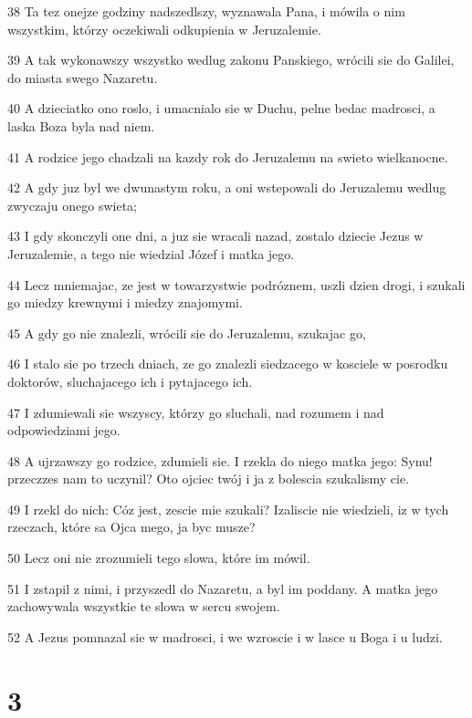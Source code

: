 \par 38 Ta tez onejze godziny nadszedlszy, wyznawala Pana, i mówila o nim wszystkim, którzy oczekiwali odkupienia w Jeruzalemie.
\par 39 A tak wykonawszy wszystko wedlug zakonu Panskiego, wrócili sie do Galilei, do miasta swego Nazaretu.
\par 40 A dzieciatko ono roslo, i umacnialo sie w Duchu, pelne bedac madrosci, a laska Boza byla nad niem.
\par 41 A rodzice jego chadzali na kazdy rok do Jeruzalemu na swieto wielkanocne.
\par 42 A gdy juz byl we dwunastym roku, a oni wstepowali do Jeruzalemu wedlug zwyczaju onego swieta;
\par 43 I gdy skonczyli one dni, a juz sie wracali nazad, zostalo dziecie Jezus w Jeruzalemie, a tego nie wiedzial Józef i matka jego.
\par 44 Lecz mniemajac, ze jest w towarzystwie podróznem, uszli dzien drogi, i szukali go miedzy krewnymi i miedzy znajomymi.
\par 45 A gdy go nie znalezli, wrócili sie do Jeruzalemu, szukajac go,
\par 46 I stalo sie po trzech dniach, ze go znalezli siedzacego w kosciele w posrodku doktorów, sluchajacego ich i pytajacego ich.
\par 47 I zdumiewali sie wszyscy, którzy go sluchali, nad rozumem i nad odpowiedziami jego.
\par 48 A ujrzawszy go rodzice, zdumieli sie. I rzekla do niego matka jego: Synu! przeczzes nam to uczynil? Oto ojciec twój i ja z bolescia szukalismy cie.
\par 49 I rzekl do nich: Cóz jest, zescie mie szukali? Izaliscie nie wiedzieli, iz w tych rzeczach, które sa Ojca mego, ja byc musze?
\par 50 Lecz oni nie zrozumieli tego slowa, które im mówil.
\par 51 I zstapil z nimi, i przyszedl do Nazaretu, a byl im poddany. A matka jego zachowywala wszystkie te slowa w sercu swojem.
\par 52 A Jezus pomnazal sie w madrosci, i we wzroscie i w lasce u Boga i u ludzi.

\chapter{3}

